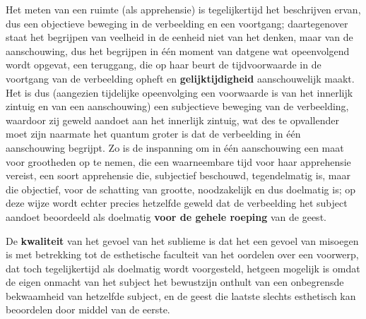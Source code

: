 Het meten van een ruimte (als apprehensie) is tegelijkertijd het beschrijven ervan, dus een objectieve beweging in de verbeelding en een voortgang; daartegenover staat het begrijpen van veelheid in de eenheid niet van het denken, maar van de aanschouwing, dus het begrijpen in één moment van datgene wat opeenvolgend wordt opgevat, een teruggang, die op haar beurt de tijdvoorwaarde in de voortgang van de verbeelding opheft en \textbf{gelijktijdigheid} aanschouwelijk maakt. Het is dus (aangezien tijdelijke opeenvolging een voorwaarde is van het innerlijk zintuig en van een aanschouwing) een subjectieve beweging van de verbeelding, waardoor zij geweld aandoet aan het innerlijk zintuig, wat des te opvallender moet zijn naarmate het quantum groter is dat de verbeelding in één aanschouwing begrijpt. Zo is de inspanning om in één aanschouwing een maat voor grootheden op te nemen, die een waarneembare tijd voor haar apprehensie vereist, een soort apprehensie die, subjectief beschouwd, tegendelmatig is, maar die objectief, voor de schatting van grootte, noodzakelijk en dus doelmatig is; op deze wijze wordt echter precies hetzelfde geweld dat de verbeelding het subject aandoet beoordeeld als doelmatig \textbf{voor de gehele roeping} van de geest.

De \textbf{kwaliteit} van het gevoel van het sublieme is dat het een gevoel van misoegen is met betrekking tot de esthetische faculteit van het oordelen over een voorwerp, dat toch tegelijkertijd als doelmatig wordt voorgesteld, hetgeen mogelijk is omdat de eigen onmacht van het subject het bewustzijn onthult van een onbegrensde bekwaamheid van hetzelfde subject, en de geest die laatste slechts esthetisch kan beoordelen door middel van de eerste.

